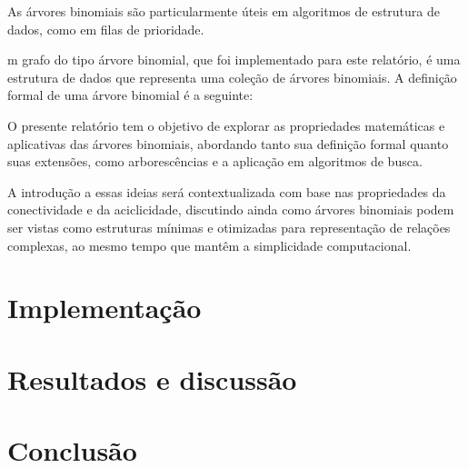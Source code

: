 \documentclass[12pt, a4paper]{scrreprt}
\begin{document}
As árvores binomiais são particularmente úteis em algoritmos de estrutura de dados, como em filas de prioridade.

m grafo do tipo árvore binomial, que foi implementado para este relatório, é uma estrutura de dados que representa uma coleção de árvores binomiais. A definição formal de uma árvore binomial é a seguinte:

O presente relatório tem o objetivo de explorar as propriedades matemáticas e aplicativas das árvores binomiais, abordando tanto sua definição formal quanto suas extensões, como arborescências e a aplicação em algoritmos de busca.

A introdução a essas ideias será contextualizada com base nas propriedades da conectividade e da aciclicidade, discutindo ainda como árvores binomiais podem ser vistas como estruturas mínimas e otimizadas para representação de relações complexas, ao mesmo tempo que mantêm a simplicidade computacional.

\chapter{Implementação}

\chapter{Resultados e discussão}

\chapter{Conclusão}


\printbibliography %
\end{document}
